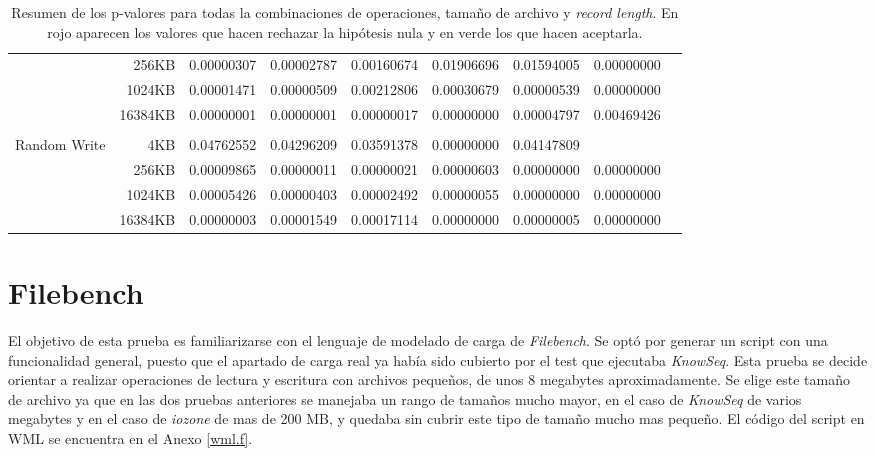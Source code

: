 \begin{table}[!htp]
\begin{tabular}{lrrrrrrrr}
&256KB &\cellcolor[HTML]{f4c7c3}0.00000307 &\cellcolor[HTML]{f4c7c3}0.00002787 &\cellcolor[HTML]{f4c7c3}0.00160674 &\cellcolor[HTML]{f4c7c3}0.01906696 &\cellcolor[HTML]{f4c7c3}0.01594005 &\cellcolor[HTML]{f4c7c3}0.00000000 \\
&1024KB &\cellcolor[HTML]{f4c7c3}0.00001471 &\cellcolor[HTML]{f4c7c3}0.00000509 &\cellcolor[HTML]{f4c7c3}0.00212806 &\cellcolor[HTML]{f4c7c3}0.00030679 &\cellcolor[HTML]{f4c7c3}0.00000539 &\cellcolor[HTML]{f4c7c3}0.00000000 \\
&16384KB &\cellcolor[HTML]{f4c7c3}0.00000001 &\cellcolor[HTML]{f4c7c3}0.00000001 &\cellcolor[HTML]{f4c7c3}0.00000017 &\cellcolor[HTML]{f4c7c3}0.00000000 &\cellcolor[HTML]{f4c7c3}0.00004797 &\cellcolor[HTML]{f4c7c3}0.00469426 \\
& & & & & & & \\
\multirow{4}{*}{Random Write} &4KB &\cellcolor[HTML]{f4c7c3}0.04762552 &\cellcolor[HTML]{f4c7c3}0.04296209 &\cellcolor[HTML]{f4c7c3}0.03591378 &\cellcolor[HTML]{f4c7c3}0.00000000 &\cellcolor[HTML]{f4c7c3}0.04147809 & \\
&256KB &\cellcolor[HTML]{f4c7c3}0.00009865 &\cellcolor[HTML]{f4c7c3}0.00000011 &\cellcolor[HTML]{f4c7c3}0.00000021 &\cellcolor[HTML]{f4c7c3}0.00000603 &\cellcolor[HTML]{f4c7c3}0.00000000 &\cellcolor[HTML]{f4c7c3}0.00000000 \\
&1024KB &\cellcolor[HTML]{f4c7c3}0.00005426 &\cellcolor[HTML]{f4c7c3}0.00000403 &\cellcolor[HTML]{f4c7c3}0.00002492 &\cellcolor[HTML]{f4c7c3}0.00000055 &\cellcolor[HTML]{f4c7c3}0.00000000 &\cellcolor[HTML]{f4c7c3}0.00000000 \\
&16384KB &\cellcolor[HTML]{f4c7c3}0.00000003 &\cellcolor[HTML]{f4c7c3}0.00001549 &\cellcolor[HTML]{f4c7c3}0.00017114 &\cellcolor[HTML]{f4c7c3}0.00000000 &\cellcolor[HTML]{f4c7c3}0.00000005 &\cellcolor[HTML]{f4c7c3}0.00000000 \\
\bottomrule
\end{tabular}
\caption{Resumen de los p-valores para todas la combinaciones de operaciones, tamaño de archivo y \textit{record length}. En rojo aparecen los valores que hacen rechazar la hipótesis nula y en verde los que hacen aceptarla.}
\end{table}

\section{Filebench}
El objetivo de esta prueba es familiarizarse con el lenguaje de modelado de carga de \textit{Filebench}. Se optó por generar un script con una funcionalidad general, puesto que el apartado de carga real ya había sido cubierto por el test que ejecutaba \textit{KnowSeq}. Esta prueba se decide orientar a realizar operaciones de lectura y escritura con archivos pequeños, de unos 8 megabytes aproximadamente. Se elige este tamaño de archivo ya que en las dos pruebas anteriores se manejaba un rango de tamaños mucho mayor, en el caso de \textit{KnowSeq} de varios megabytes y en el caso de \textit{iozone} de mas de 200 MB, y quedaba sin cubrir este tipo de tamaño mucho mas pequeño. El código del script en WML se encuentra en el Anexo \ref{wml.f}.\\

